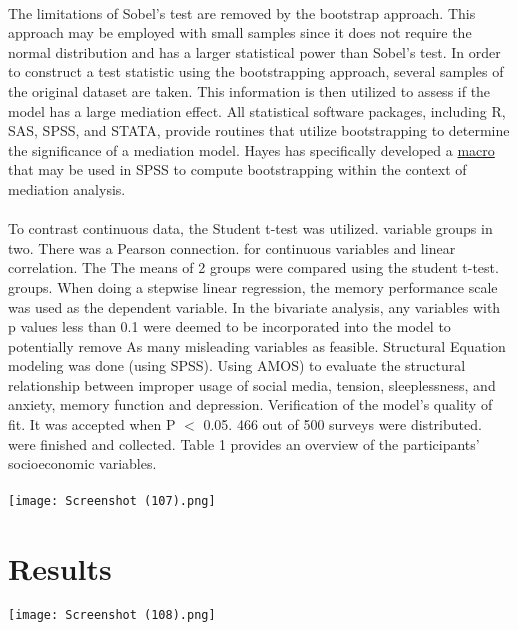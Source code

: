 \documentclass[12pt]{report}
\begin{document}
\paragraph{}

The limitations of Sobel's test are removed by the bootstrap approach. This approach may be employed with small samples since it does not require the normal distribution and has a larger statistical power than Sobel's test. In order to construct a test statistic using the bootstrapping approach, several samples of the original dataset are taken. This information is then utilized to assess if the model has a large mediation effect. All statistical software packages, including R, SAS, SPSS, and STATA, provide routines that utilize bootstrapping to determine the significance of a mediation model. Hayes has specifically developed a \href{http://www.afhayes.com/index.html}{macro} that may be used in SPSS to compute bootstrapping within the context of mediation analysis.

\paragraph{}
To contrast continuous data, the Student t-test was utilized.
variable groups in two. There was a Pearson connection.
for continuous variables and linear correlation. The
The means of 2 groups were compared using the student t-test.
groups. When doing a stepwise linear regression, the memory performance scale was used as the dependent variable. In the bivariate analysis, any variables with p values less than 0.1 were deemed to be
incorporated into the model to potentially remove
As many misleading variables as feasible. Structural
Equation modeling was done (using SPSS).
Using AMOS) to evaluate the structural relationship between
improper usage of social media, tension, sleeplessness, and anxiety,
memory function and depression. Verification of the model's quality of fit. It was accepted when P \begin{math}<\end{math} 0.05. 466 out of 500 surveys were distributed.
were finished and collected. Table 1 provides an overview of the participants' socioeconomic variables.
\paragraph{}
\texttt{[image: Screenshot (107).png]}

\section*{Results}
\texttt{[image: Screenshot (108).png]}
\end{document}
